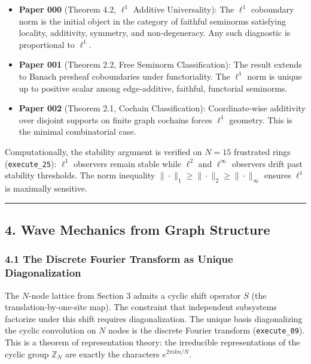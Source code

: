 \documentclass[
]{article}
\providecommand{\tightlist}{%
  \setlength{\itemsep}{0pt}\setlength{\parskip}{0pt}}
\begin{document}
\begin{itemize}
\tightlist
\item
  \textbf{Paper 000} (Theorem 4.2, \(\ell^1\) Additive Universality):
  The \(\ell^1\) coboundary norm is the initial object in the category
  of faithful seminorms satisfying locality, additivity, symmetry, and
  non-degeneracy. Any such diagnostic is proportional to \(\ell^1\).
\item
  \textbf{Paper 001} (Theorem 2.2, Free Seminorm Classification): The
  result extends to Banach presheaf coboundaries under functoriality.
  The \(\ell^1\) norm is unique up to positive scalar among
  edge-additive, faithful, functorial seminorms.
\item
  \textbf{Paper 002} (Theorem 2.1, Cochain Classification):
  Coordinate-wise additivity over disjoint supports on finite graph
  cochains forces \(\ell^1\) geometry. This is the minimal combinatorial
  case.
\end{itemize}

Computationally, the stability argument is verified on \(N = 15\)
frustrated rings (\texttt{execute\_25}): \(\ell^1\) observers remain
stable while \(\ell^2\) and \(\ell^\infty\) observers drift past
stability thresholds. The norm inequality
\(\|\cdot\|_1 \geq \|\cdot\|_2 \geq \|\cdot\|_\infty\) ensures
\(\ell^1\) is maximally sensitive.

\begin{center}\rule{0.5\linewidth}{0.5pt}\end{center}

\hypertarget{wave-mechanics-from-graph-structure}{%
\subsection{4. Wave Mechanics from Graph
Structure}\label{wave-mechanics-from-graph-structure}}

\hypertarget{the-discrete-fourier-transform-as-unique-diagonalization}{%
\subsubsection{4.1 The Discrete Fourier Transform as Unique
Diagonalization}\label{the-discrete-fourier-transform-as-unique-diagonalization}}

The \(N\)-node lattice from Section 3 admits a cyclic shift operator
\(S\) (the translation-by-one-site map). The constraint that independent
subsystems factorize under this shift requires diagonalization. The
unique basis diagonalizing the cyclic convolution on \(N\) nodes is the
discrete Fourier transform (\texttt{execute\_09}). This is a theorem of
representation theory: the irreducible representations of the cyclic
group \(\mathbb{Z}_N\) are exactly the characters
\(e^{2\pi i k n / N}\).
\end{document}
